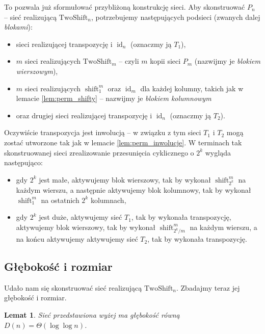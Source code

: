 \documentclass[a4paper]{article}
\newcommand{\shift}[2]{\operatorname{shift}_{#2}^{#1}}
\newcommand{\id}[1]{\operatorname{id}_{#1}}
\newcommand{\twoshift}[1]{\text{TwoShift}_{#1}}
\newtheorem{lem}[tw]{Lemat}
\theoremstyle{definition}
\begin{document}
To pozwala już sformułować przybliżoną konstrukcję sieci. Aby skonstruować \(P_n\) -- sieć realizującą \(\twoshift n\), potrzebujemy następujących podsieci (zwanych dalej \textit{blokami}):

\begin{itemize}
    \item sieci realizującej transpozycję i \(\id n\) (oznaczmy ją \(T_1\)),
    \item \(m\) sieci realizujących \( \twoshift m\) -- czyli \(m\) kopii sieci \(P_m\) (nazwijmy je \textit{blokiem wierszowym}),
    \item \(m\) sieci realizujących \(\shift m 1\) oraz \(\id m\) dla każdej kolumny, takich jak w lemacie \ref{lem:perm_shifty} -- nazwijmy je \textit{blokiem kolumnowym}
    \item oraz drugiej sieci realizującej transpozycję i \(\id n\) (oznaczmy ją \(T_2\)).
\end{itemize}


Oczywiście transpozycja jest inwolucją -- w związku z tym sieci \(T_1\) i \(T_2\) mogą zostać utworzone tak jak w lemacie \ref{lem:perm_inwolucje}. 
W terminach tak skonstruowanej sieci zrealizowanie przesunięcia cyklicznego o \(2^k\) wygląda następująco:

\begin{itemize}
    \item gdy \(2^k\) jest małe, aktywujemy blok wierszowy, tak by wykonał \(\shift m {2^k}\) na każdym wierszu, a następnie aktywujemy blok kolumnowy, tak by wykonał \(\shift m 1\) na ostatnich \(2^k\) kolumnach,
    \item gdy \(2^k\) jest duże, aktywujemy sieć \(T_1\), tak by wykonała transpozycję, aktywujemy blok wierszowy, tak by wykonał \(\shift m {2^k/m}\) na każdym wierszu, a na końcu aktywujemy aktywujemy sieć \(T_2\), tak by wykonała transpozycję.
\end{itemize}

\subsection{Głębokość i rozmiar}

Udało nam się skonstruować sieć realizującą \(\twoshift n\). Zbadajmy teraz jej głębokość i rozmiar.

\begin{lem}
    Sieć przedstawiona wyżej ma głębokość równą \(D(n) = \Theta(\log \log n)\).
\end{lem}
\end{document}
